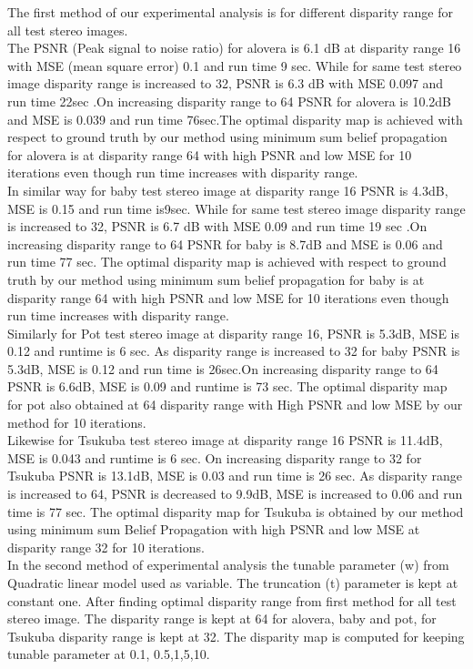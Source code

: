 \documentclass{singlecol-new}
\theoremstyle{TH}{
\newtheorem{lemma}{Lemma}
\newtheorem{theorem}[lemma]{Theorem}
\newtheorem{corrolary}[lemma]{Corrolary}
\newtheorem{conjecture}[lemma]{Conjecture}
\newtheorem{proposition}[lemma]{Proposition}
\newtheorem{claim}[lemma]{Claim}
\newtheorem{stheorem}[lemma]{Wrong Theorem}
\newtheorem{algorithm}{Algorithm}
}
\theoremstyle{THrm}{
\newtheorem{definition}{Definition}[section]
\newtheorem{question}{Question}[section]
\newtheorem{remark}{Remark}
\newtheorem{scheme}{Scheme}
}
\theoremstyle{THhit}{
\newtheorem{case}{Case}[section]
}
\begin{document}
The first method of our experimental   analysis is for different disparity range for all test stereo images.\\
The PSNR (Peak signal to noise ratio) for alovera is 6.1 dB at disparity range 16 with MSE (mean square error) 0.1 and run time 9 sec. While for same test stereo image disparity range is increased to 32, PSNR is 6.3 dB with MSE 0.097 and run time 22sec .On increasing disparity range to 64 PSNR for alovera is 10.2dB and MSE is 0.039 and run time 76sec.The optimal disparity map is achieved with respect to ground truth by our method using minimum sum belief propagation for alovera is   at disparity range 64 with high PSNR and low MSE for 10 iterations even though run time increases with disparity range.\\
In similar way for baby test stereo image at disparity range 16 PSNR is 4.3dB, MSE is 0.15 and run time is9sec. While for same test stereo image disparity range is increased to 32, PSNR is 6.7 dB with MSE 0.09 and run time 19 sec .On increasing disparity range to 64 PSNR for baby is 8.7dB and MSE is 0.06 and run time 77 sec. The optimal disparity map is achieved with respect to ground truth by our method using  minimum sum belief propagation  for baby  is   at disparity range 64 with high PSNR  and low MSE  for 10 iterations even though run time  increases with disparity range.\\
Similarly for Pot test stereo image at disparity range 16, PSNR is 5.3dB, MSE is 0.12 and runtime is 6 sec. As disparity range is increased to 32 for baby PSNR is 5.3dB, MSE is 0.12 and run time is 26sec.On increasing disparity range to 64 PSNR is 6.6dB, MSE is 0.09 and runtime is 73 sec. The optimal disparity map for pot also obtained at 64 disparity range with High PSNR and low MSE by our method for 10 iterations.\\
Likewise for Tsukuba test stereo image at disparity range 16 PSNR is 11.4dB, MSE is 0.043 and runtime is 6 sec. On increasing disparity range to 32 for Tsukuba PSNR is 13.1dB, MSE is 0.03 and run time is 26 sec. As disparity range is increased to 64, PSNR is decreased to 9.9dB, MSE is increased to 0.06 and run time is 77 sec. The optimal disparity map for Tsukuba is obtained by our method using minimum sum Belief Propagation with high PSNR and low MSE at disparity range 32 for 10 iterations.\\
In the second method of experimental analysis the tunable parameter (w) from Quadratic linear model used as variable. The truncation (t) parameter is kept at constant one. After finding optimal disparity range from first method for all test stereo image. The disparity range is kept at 64 for alovera, baby and pot, for Tsukuba disparity range is kept at 32. The disparity map is computed for keeping tunable parameter at 0.1, 0.5,1,5,10.\\
\end{document}
